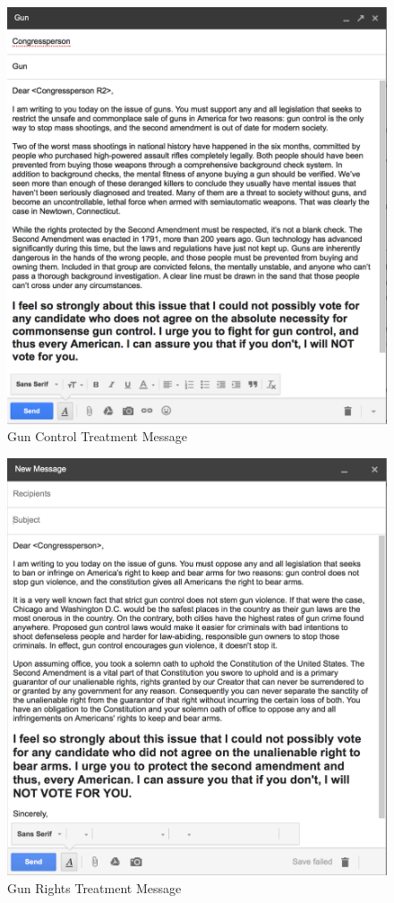 \documentclass[12pt]{article}
\begin{document}
\begin{figure}[h!]
	\caption{Gun Control Treatment Message}
	\includegraphics[width=\textwidth]{gun_control.png}
\end{figure}

\begin{figure}[h!]
	\caption{Gun Rights Treatment Message}
	\includegraphics[width=\textwidth]{gun_rights.png}
\end{figure}
\end{document}
